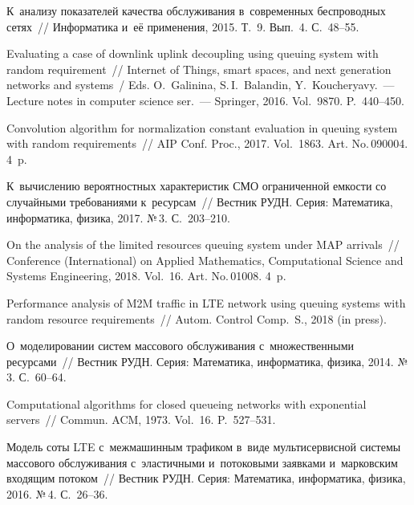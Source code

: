 \begin{multicols}{2}
{{\begin{thebibliography}{99}
К~анализу показателей качества обслуживания в~современных беспроводных сетях~// 
{Информатика и~её применения}, 2015. Т.~9. Вып.~4. С.~48--55.

Evaluating a case of downlink uplink decoupling using queuing system with random 
requirement~// 
Internet of Things, smart spaces, and
next generation
networks and systems~/
Eds. O.~Galinina, S.\,I.~Balandin, Y.~Koucheryavy.~---
{Lecture notes in computer science ser.}~--- Springer, 2016. Vol.~9870. P.~440--450.

Convolution algorithm for normalization constant evaluation in queuing system 
with random requirements~// {AIP Conf. Proc.}, 2017. Vol.~1863. Art. 
No.\,090004. 4~p.

К~вычислению вероятностных характеристик СМО ограниченной емкости со случайными 
требованиями к~ресурсам~// {Вестник РУДН. Серия: Математика, информатика, 
физика}, 2017. №\,3. С.~203--210.



On the analysis of the limited resources queuing system under MAP arrivals~// 
{Conference (International)  on Applied Mathematics, Computational Science and 
Systems Engineering}, 2018. Vol.~16. Art. No.\,01008. 4~p.

Performance analysis of M2M traffic in LTE network using queuing systems with 
random resource requirements~// {Autom. Control Comp.~S.}, 2018 
(in press).

О~моделировании систем массового обслуживания с~множественными ресурсами~// 
{Вестник РУДН. Серия: Математика, информатика, физика}, 2014. №\,3. С.~60--64.

Computational algorithms for closed queueing networks with exponential servers~// 
{Commun. ACM}, 1973. Vol.~16. P.~527--531.



Модель соты LTE с~межмашинным трафиком в~виде мультисервисной системы массового 
обслуживания с~эластичными и~потоковыми заявками и~марковским входящим потоком~// 
{Вестник РУДН. Серия: Математика, информатика, физика}, 2016. №\,4. С.~26--36.


\end{thebibliography}}}
\end{multicols}
